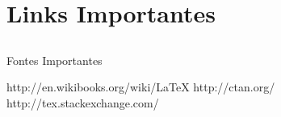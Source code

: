 \documentclass [11pt, a4paper]{beamer}
\begin{document}
\section{Links Importantes}
\subsection{}
\begin{frame}{Fontes Importantes}
  \begin{thebibliography}{10}
  \beamertemplatearticlebibitems
    http://en.wikibooks.org/wiki/LaTeX
    \newblock \href{http://en.wikibooks.org/wiki/LaTeX}{}
    http://ctan.org/
    \newblock \href{http://ctan.org/}{}
    http://tex.stackexchange.com/
    \newblock \href{http://tex.stackexchange.com/}{}
  \end{thebibliography}
\end{frame}
\end{document}
